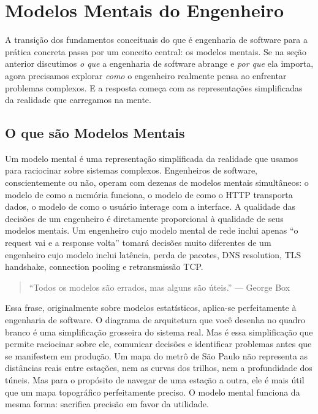 \section{Modelos Mentais do Engenheiro}

A transição dos fundamentos conceituais do que é engenharia de software
para a prática concreta passa por um conceito central: os modelos mentais.
Se na seção anterior discutimos \emph{o que} a engenharia de software
abrange e \emph{por que} ela importa, agora precisamos explorar \emph{como}
o engenheiro realmente pensa ao enfrentar problemas complexos. E a resposta
começa com as representações simplificadas da realidade que carregamos na
mente.

\subsection{O que são Modelos Mentais}

Um modelo mental é uma representação simplificada da realidade que usamos
para raciocinar sobre sistemas complexos. Engenheiros de software,
conscientemente ou não, operam com dezenas de modelos mentais simultâneos:
o modelo de como a memória funciona, o modelo de como o HTTP transporta
dados, o modelo de como o usuário interage com a interface. A qualidade
das decisões de um engenheiro é diretamente proporcional à qualidade de
seus modelos mentais. Um engenheiro cujo modelo mental de rede inclui
apenas ``o request vai e a response volta'' tomará decisões muito
diferentes de um engenheiro cujo modelo inclui latência, perda de
pacotes, DNS resolution, TLS handshake, connection pooling e
retransmissão TCP.

\begin{quote}
``Todos os modelos são errados, mas alguns são úteis.'' --- George Box
\end{quote}

Essa frase, originalmente sobre modelos estatísticos, aplica-se
perfeitamente à engenharia de software. O diagrama de arquitetura que
você desenha no quadro branco é uma simplificação grosseira do sistema
real. Mas é essa simplificação que permite raciocinar sobre ele,
comunicar decisões e identificar problemas antes que se manifestem em
produção. Um mapa do metrô de São Paulo não representa as distâncias
reais entre estações, nem as curvas dos trilhos, nem a profundidade dos
túneis. Mas para o propósito de navegar de uma estação a outra, ele é
mais útil que um mapa topográfico perfeitamente preciso. O modelo mental
funciona da mesma forma: sacrifica precisão em favor da utilidade.

